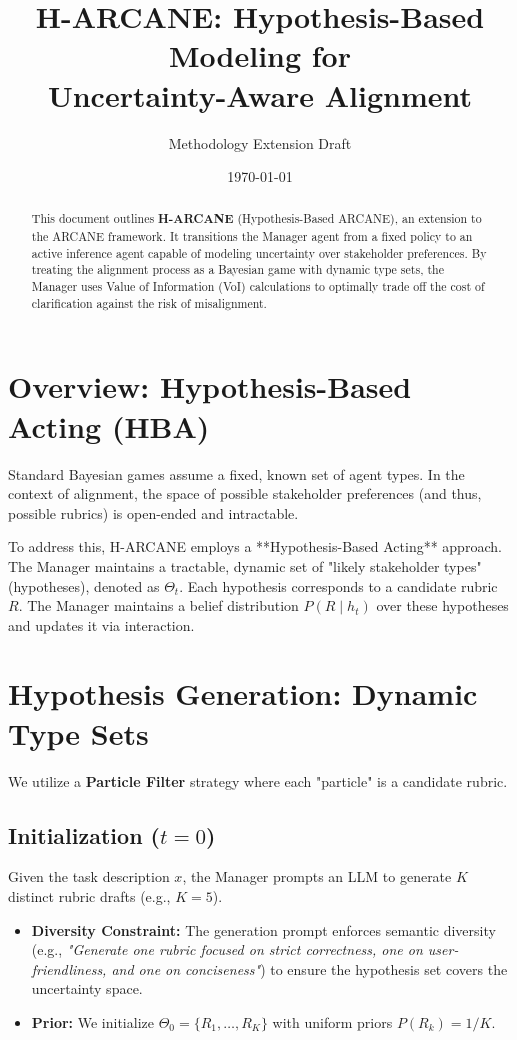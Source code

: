 \documentclass[letterpaper]{article}
\title{\textbf{H-ARCANE: Hypothesis-Based Modeling for \\ Uncertainty-Aware Alignment}}
\author{Methodology Extension Draft}
\date{\today}
\newcommand{\ThetaSet}{\Theta}
\newcommand{\Rubric}{R}
\newcommand{\History}{h}
\begin{document}
\maketitle

\begin{abstract}
This document outlines \textbf{H-ARCANE} (Hypothesis-Based ARCANE), an extension to the ARCANE framework. It transitions the Manager agent from a fixed policy to an active inference agent capable of modeling uncertainty over stakeholder preferences. By treating the alignment process as a Bayesian game with dynamic type sets, the Manager uses Value of Information (VoI) calculations to optimally trade off the cost of clarification against the risk of misalignment.
\end{abstract}

\section{Overview: Hypothesis-Based Acting (HBA)}

Standard Bayesian games assume a fixed, known set of agent types. In the context of alignment, the space of possible stakeholder preferences (and thus, possible rubrics) is open-ended and intractable. 

To address this, H-ARCANE employs a **Hypothesis-Based Acting** approach. The Manager maintains a tractable, dynamic set of "likely stakeholder types" (hypotheses), denoted as $\ThetaSet_t$. Each hypothesis corresponds to a candidate rubric $\Rubric$. The Manager maintains a belief distribution $P(\Rubric \mid \History_t)$ over these hypotheses and updates it via interaction.

\section{Hypothesis Generation: Dynamic Type Sets}

We utilize a \textbf{Particle Filter} strategy where each "particle" is a candidate rubric.

\subsection{Initialization ($t=0$)}
Given the task description $x$, the Manager prompts an LLM to generate $K$ distinct rubric drafts (e.g., $K=5$). 
\begin{itemize}
    \item \textbf{Diversity Constraint:} The generation prompt enforces semantic diversity (e.g., \textit{"Generate one rubric focused on strict correctness, one on user-friendliness, and one on conciseness"}) to ensure the hypothesis set covers the uncertainty space.
    \item \textbf{Prior:} We initialize $\ThetaSet_0 = \{\Rubric_1, \dots, \Rubric_K\}$ with uniform priors $P(\Rubric_k) = 1/K$.
\end{itemize}
\end{document}
